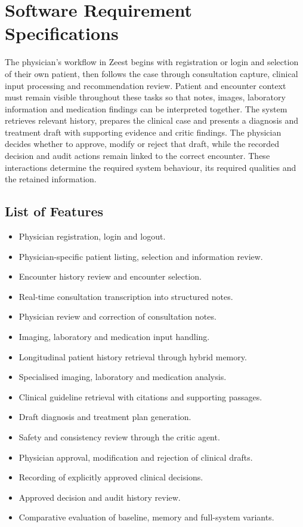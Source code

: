 \begingroup
\renewcommand{\encodingdefault}{T1}
\selectfont
\chapter{Software Requirement Specifications}
The physician's workflow in Zeest begins with registration or login and selection of their own patient, then follows the case through consultation capture, clinical input processing and recommendation review. Patient and encounter context must remain visible throughout these tasks so that notes, images, laboratory information and medication findings can be interpreted together. The system retrieves relevant history, prepares the clinical case and presents a diagnosis and treatment draft with supporting evidence and critic findings. The physician decides whether to approve, modify or reject that draft, while the recorded decision and audit actions remain linked to the correct encounter. These interactions determine the required system behaviour, its required qualities and the retained information.

\section{List of Features}
\begin{itemize}
\item Physician registration, login and logout.
\item Physician-specific patient listing, selection and information review.
\item Encounter history review and encounter selection.
\item Real-time consultation transcription into structured notes.
\item Physician review and correction of consultation notes.
\item Imaging, laboratory and medication input handling.
\item Longitudinal patient history retrieval through hybrid memory.
\item Specialised imaging, laboratory and medication analysis.
\item Clinical guideline retrieval with citations and supporting passages.
\item Draft diagnosis and treatment plan generation.
\item Safety and consistency review through the critic agent.
\item Physician approval, modification and rejection of clinical drafts.
\item Recording of explicitly approved clinical decisions.
\item Approved decision and audit history review.
\item Comparative evaluation of baseline, memory and full-system variants.
\end{itemize}

